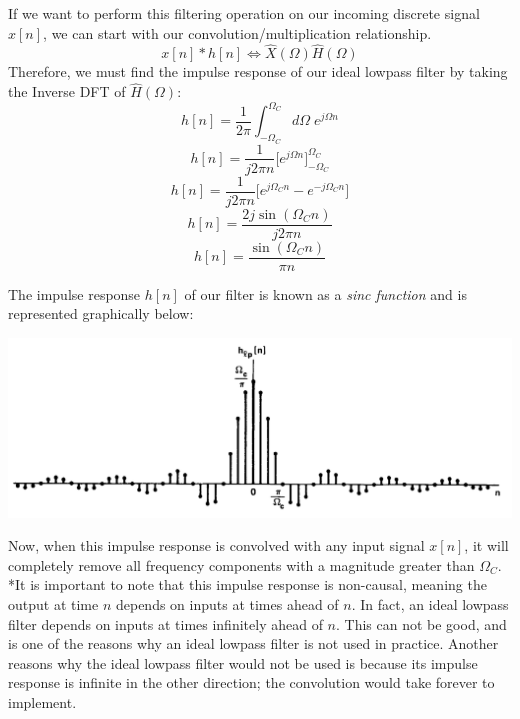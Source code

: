 \documentclass[a4paper]{article}
\numberwithin{equation}{section}
\begin{document}
If we want to perform this filtering operation on our incoming discrete signal $x[n]$, we can start with our convolution/multiplication relationship. 
\begin{equation}
x[n]*h[n] \Longleftrightarrow \hat{X}(\Omega)\hat{H}(\Omega)
\end{equation}
Therefore, we must find the impulse response of our ideal lowpass filter by taking the Inverse DFT of $\hat{H}(\Omega)$:
\begin{equation}
h[n]=\frac{1}{2\pi}\int_{-\Omega_C}^{\Omega_C}d\Omega \; e^{j\Omega n}
\end{equation}
\begin{equation}
h[n]=\frac{1}{j2\pi n }\big[ e^{j\Omega n}\big]_{-\Omega_C}^{\Omega_C}
\end{equation}
\begin{equation}
h[n]=\frac{1}{j2\pi n }\big[ e^{j\Omega_C n}-e^{-j\Omega_C n}\big]
\end{equation}
\begin{equation}
h[n]=\frac{2j\sin{(\Omega_C n)}}{j2\pi n }
\end{equation}
\begin{equation}
h[n]=\frac{\sin{(\Omega_C n)}}{\pi n }
\end{equation}

The impulse response $h[n]$ of our filter is known as a \textit{sinc function} and is represented graphically below:
\begin{center}
\includegraphics[scale=0.39]{lowpass_ideal_n.png}
\end{center}
Now, when this impulse response is convolved with any input signal $x[n]$, it will completely remove all frequency components with a magnitude greater than $\Omega_C$.\\

*It is important to note that this impulse response is non-causal, meaning the output at time $n$ depends on inputs at times ahead of $n$. In fact, an ideal lowpass filter depends on inputs at times infinitely ahead of $n$. This can not be good, and is one of the reasons why an ideal lowpass filter is not used in practice. Another reasons why the ideal lowpass filter would not be used is because its  impulse response is infinite in the other direction; the convolution would take forever to implement. \\
\end{document}

